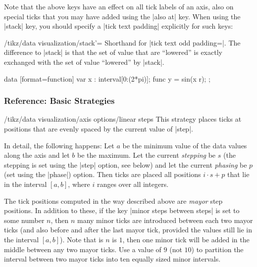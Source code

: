 Note that the above keys have an effect on all tick labels of an axis,
also on special ticks that you may have added using the |also at|
key. When using the |stack| key, you should specify a |tick text padding|
explicitly for such keys:

\begin{key}{/tikz/data visualization/stack'=}
  Shorthand for |tick text odd padding=|. The
  difference to |stack| is that the set of value that are
  ``lowered'' is exactly exchanged with the set of value ``lowered''
  by |stack|.
\begin{codeexample}[]
\tikz \datavisualization [scientific axes, x axis={ticks={stack, many, major also at=
                            {(pi) as [{tick text padding=2.5em}] $\pi$}}},
                          visualize as smooth line]
  data [format=function] {
    var x : interval[0:(2*pi)];
    func y = sin(\value x r);
  };
\end{codeexample}
\end{key}



\subsubsection{Reference: Basic Strategies}

\label{section-dv-strategies}

\begin{key}{/tikz/data visualization/axis options/linear steps}
  This strategy places ticks at positions that are evenly spaced by
  the current value of |step|.

  In detail, the following happens: Let $a$ be the minimum value of the
  data values along the axis and let $b$ be the maximum. Let the
  current \emph{stepping} be $s$ (the stepping is set using the |step|
  option, see below) and let the current \emph{phasing} be $p$ (set
  using the |phase|) option. Then ticks are placed all positions
  $i\cdot s + p$ that lie in the interval $[a,b]$, where $i$ ranges
  over all integers.

  The tick positions computed in the way described above are
  \emph{mayor} step positions. In addition to these, if the key
  |minor steps between steps| is set to some number $n$, then $n$ many
  minor ticks are introduced between each two mayor ticks (and also
  before and after the last mayor tick, provided the values still lie
  in the interval $[a,b]$). Note that is $n$ is $1$, then one minor tick
  will be added in the middle between any two mayor ticks. Use a value
  of $9$ (not $10$) to partition the interval between two mayor ticks
  into ten equally sized minor intervals.

\begin{codeexample}[]
\end{codeexample}
\end{key}

